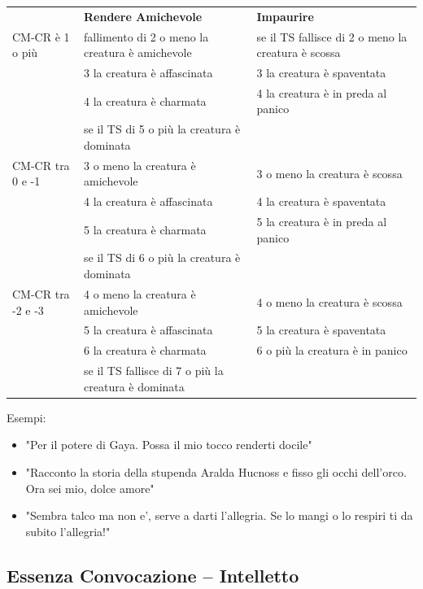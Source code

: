 \documentclass[a4paper,11pt,twoside,openany]{book}
\begin{document}
\begin{tabular}{L{2.5cm} L{7cm} L{7cm}}
\toprule
 & \textbf{Rendere Amichevole} & \textbf{Impaurire}\tabularnewline
CM-CR è 1 o più & fallimento di 2 o meno la creatura è amichevole & se il TS fallisce di 2 o meno la creatura è scossa\tabularnewline
& 3 la creatura è affascinata & 3 la creatura è spaventata\tabularnewline
& 4 la creatura è charmata & 4 la creatura è in preda al panico\tabularnewline
& se il TS di 5 o più la creatura è dominata & \tabularnewline
CM-CR tra 0 e -1 & 3 o meno la creatura è amichevole & 3 o meno la creatura è scossa\tabularnewline
& 4 la creatura è affascinata & 4 la creatura è spaventata\tabularnewline
& 5 la creatura è charmata & 5 la creatura è in preda al panico\tabularnewline
& se il TS di 6 o più la creatura è dominata & \tabularnewline
CM-CR tra -2 e -3 & 4 o meno la creatura è amichevole & 4 o meno la creatura è scossa\tabularnewline
 & 5 la creatura è affascinata & 5 la creatura è spaventata\tabularnewline
 & 6 la creatura è charmata & 6 o più la creatura è in panico\tabularnewline
 & se il TS fallisce di 7 o più la creatura è dominata & \tabularnewline
\end{tabular}


\bigskip

Esempi:
\begin{itemize}
\item 
"Per il potere di Gaya. Possa il mio tocco renderti docile" 
\item 
"Racconto la storia della stupenda Aralda Hucnoss e fisso gli occhi dell'orco. Ora sei mio, dolce amore" 
\item 
"Sembra talco ma non e', serve a darti l'allegria. Se lo mangi o lo respiri ti da subito l'allegria!" 
\end{itemize}

\pagebreak

\subsection{Essenza Convocazione -- Intelletto}


\label{essenza-convocazione---intelletto}
\end{document}
